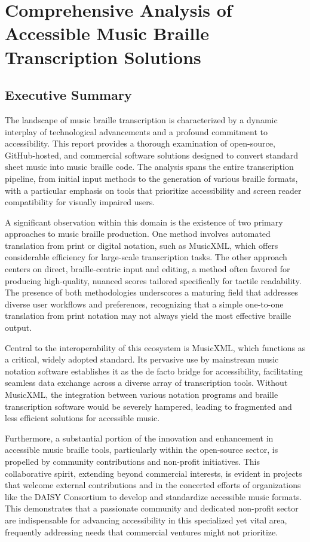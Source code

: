 \chapter{Comprehensive Analysis of Accessible Music Braille Transcription Solutions}\label{chap:music-braille}

\section{Executive Summary}\label{sec:music-executive-summary}
The landscape of music braille transcription is characterized by a dynamic interplay of technological advancements and a profound commitment to accessibility. This report provides a thorough examination of open-source, GitHub-hosted, and commercial software solutions designed to convert standard sheet music into music braille code. The analysis spans the entire transcription pipeline, from initial input methods to the generation of various braille formats, with a particular emphasis on tools that prioritize accessibility and screen reader compatibility for visually impaired users.

A significant observation within this domain is the existence of two primary approaches to music braille production. One method involves automated translation from print or digital notation, such as MusicXML, which offers considerable efficiency for large-scale transcription tasks. The other approach centers on direct, braille-centric input and editing, a method often favored for producing high-quality, nuanced scores tailored specifically for tactile readability. The presence of both methodologies underscores a maturing field that addresses diverse user workflows and preferences, recognizing that a simple one-to-one translation from print notation may not always yield the most effective braille output.

Central to the interoperability of this ecosystem is MusicXML, which functions as a critical, widely adopted standard. Its pervasive use by mainstream music notation software establishes it as the de facto bridge for accessibility, facilitating seamless data exchange across a diverse array of transcription tools. Without MusicXML, the integration between various notation programs and braille transcription software would be severely hampered, leading to fragmented and less efficient solutions for accessible music. \cite{MusicAccessibilityResources}

Furthermore, a substantial portion of the innovation and enhancement in accessible music braille tools, particularly within the open-source sector, is propelled by community contributions and non-profit initiatives. This collaborative spirit, extending beyond commercial interests, is evident in projects that welcome external contributions and in the concerted efforts of organizations like the DAISY Consortium to develop and standardize accessible music formats. This demonstrates that a passionate community and dedicated non-profit sector are indispensable for advancing accessibility in this specialized yet vital area, frequently addressing needs that commercial ventures might not prioritize. \cite{DAISYDevelopments}



